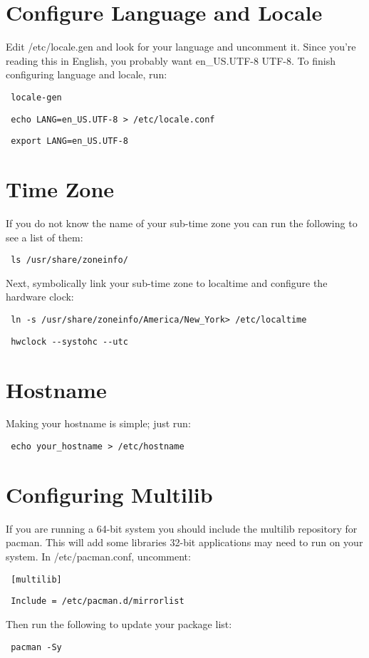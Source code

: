 \documentclass[12pt]{article}
\begin{document}
\section*{Configure Language and Locale}
    Edit /etc/locale.gen and look for your language and uncomment it. Since
    you're reading this in English, you probably want en\_US.UTF-8 UTF-8. To
    finish configuring language and locale, run:
    \begin{verbatim} locale-gen \end{verbatim}
    \begin{verbatim} echo LANG=en_US.UTF-8 > /etc/locale.conf \end{verbatim}
    \begin{verbatim} export LANG=en_US.UTF-8 \end{verbatim}

\section*{Time Zone}
    If you do not know the name of your sub-time zone you can run the following
    to see a list of them:
    \begin{verbatim} ls /usr/share/zoneinfo/ \end{verbatim}
    Next, symbolically link your sub-time zone to localtime and configure the
    hardware clock:
    \begin{verbatim} ln -s /usr/share/zoneinfo/America/New_York> /etc/localtime \end {verbatim}
    \begin{verbatim} hwclock --systohc --utc \end {verbatim}

\section*{Hostname}
    Making your hostname is simple; just run:
    \begin{verbatim} echo your_hostname > /etc/hostname \end{verbatim}

\section*{Configuring Multilib}
    If you are running a 64-bit system you should include the multilib
    repository for pacman. This will add some libraries 32-bit applications may
    need to run on your system. In /etc/pacman.conf, uncomment:
    \begin{verbatim} [multilib] \end{verbatim}
    \begin{verbatim} Include = /etc/pacman.d/mirrorlist \end{verbatim}
    Then run the following to update your package list:
    \begin{verbatim} pacman -Sy \end{verbatim}
\end{document}
